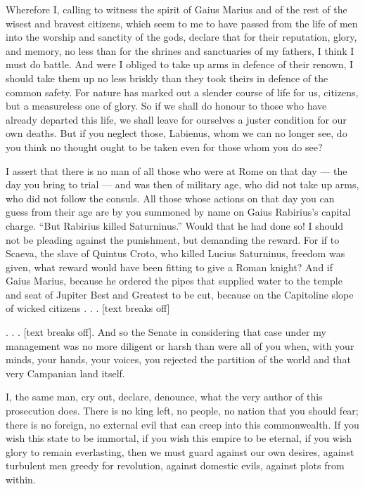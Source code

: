  Wherefore I, calling to witness the spirit of Gaius Marius and of the rest of the wisest and bravest citizens, which seem to me to have passed from the life of men into the worship and sanctity of the gods, declare that for their reputation, glory, and memory, no less than for the shrines and sanctuaries of my fathers, I think I must do battle. And were I obliged to take up arms in defence of their renown, I should take them up no less briskly than they took theirs in defence of the common safety. For nature has marked out a slender course of life for us, citizens, but a measureless one of glory. So if we shall do honour to those who have already departed this life, we shall leave for ourselves a juster condition for our own deaths. But if you neglect those, Labienus, whom we can no longer see, do you think no thought ought to be taken even for those whom you do see?

 I assert that there is no man of all those who were at Rome on that day --- the day you bring to trial --- and was then of military age, who did not take up arms, who did not follow the consuls. All those whose actions on that day you can guess from their age are by you summoned by name on Gaius Rabirius's capital charge. ``But Rabirius killed Saturninus.'' Would that he had done so! I should not be pleading against the punishment, but demanding the reward. For if to Scaeva, the slave of Quintus Croto, who killed Lucius Saturninus, freedom was given, what reward would have been fitting to give a Roman knight? And if Gaius Marius, because he ordered the pipes that supplied water to the temple and seat of Jupiter Best and Greatest to be cut, because on the Capitoline slope of wicked citizens . . .  [text breaks off]

 . . . [text breaks off]. And so the Senate in considering that case under my management was no more diligent or harsh than were all of you when, with your minds, your hands, your voices, you rejected the partition of the world and that very Campanian land itself.

 I, the same man, cry out, declare, denounce, what the very author of this prosecution does. There is no king left, no people, no nation that you should fear; there is no foreign, no external evil that can creep into this commonwealth. If you wish this state to be immortal, if you wish this empire to be eternal, if you wish glory to remain everlasting, then we must guard against our own desires, against turbulent men greedy for revolution, against domestic evils, against plots from within.


